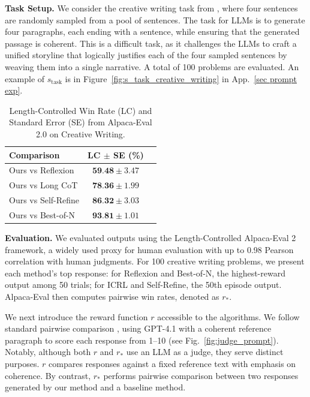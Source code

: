 \documentclass{article} %
\newcommand{\0}{\mathbf{0}}
\begin{document}
\textbf{Task Setup.} We consider the creative writing task from \cite{tot}, where four sentences are randomly sampled from a pool of sentences. The task for LLMs is to generate four paragraphs, each ending with a sentence, while ensuring that the generated passage is coherent. This is a difficult task, as it challenges the LLMs to craft a unified storyline that logically justifies each of the four sampled sentences by weaving them into a single narrative. A total of 100 problems are evaluated. An example of $s_\text{task}$ is in Figure~\ref{fig:s_task_creative_writing} in App.~\ref{sec prompt exp}.\\
\begin{table}
  \centering
  \caption{Length-Controlled Win Rate (LC) and Standard Error (SE) from Alpaca-Eval 2.0 on Creative Writing.}
  \label{tab:pairwise_win_rates}
  \begin{tabular}{@{}lcc@{}}
    \toprule
    Comparison                   & LC  $\pm$ SE (\%) \\
    \midrule
    Ours vs Reflexion            & $\textbf{59.48}          \pm 3.47$                 \\
    Ours vs Long CoT     & $\textbf{78.36}           \pm 1.99$               \\
    Ours vs Self-Refine          & $\textbf{86.32}            \pm 3.03$                 \\
    Ours vs Best-of-N            & $\textbf{93.81}           \pm 1.01$                 \\
    \bottomrule
  \end{tabular}
\end{table}
\textbf{Evaluation.} 
We evaluated outputs using the Length-Controlled Alpaca-Eval 2 \citep{alpaca_eval} framework, a widely used proxy for human evaluation \citep{hong-etal-2024-orpo, kto, meng2024simposimplepreferenceoptimization} with up to 0.98 Pearson correlation with human judgments. For 100 creative writing problems, we present each method’s top response: for Reflexion and Best-of-N, the highest-reward output among 50 trials; for ICRL and Self-Refine, the 50th episode output. Alpaca-Eval then computes pairwise win rates, denoted as $r_*$.  

We next introduce the reward function $r$ accessible to the algorithms. We follow standard pairwise comparison \citep{zheng2023judgingllmasajudgemtbenchchatbot}, using GPT-4.1 with a coherent reference paragraph to score each response from 1--10 (see Fig.~\ref{fig:judge_prompt}). Notably, although both  $r$ and $r_*$ use an LLM as a judge, they serve distinct purposes. $r$ compares responses against a fixed reference text with emphasis on coherence. By contrast, $r_*$ performs pairwise comparison between two responses generated by our method and a baseline method. 
\end{document}
